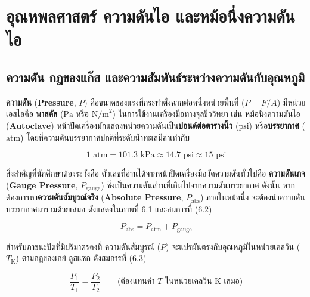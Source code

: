\clearpage

\chapter{อุณหพลศาสตร์ ความดันไอ และหม้อนึ่งความดันไอ}

\section{ความดัน กฎของแก๊ส และความสัมพันธ์ระหว่างความดันกับอุณหภูมิ}


\textbf{ความดัน} (\textbf{Pressure}, $P$) คือขนาดของแรงที่กระทำตั้งฉากต่อหนึ่งหน่วยพื้นที่ ($P = F/A$) มีหน่วยเอสไอคือ \textbf{พาสคัล} ($\text{Pa}$ หรือ $\text{N/m}^2$) ในการใช้งานเครื่องมือทางจุลชีววิทยา เช่น หม้อนึ่งความดันไอ (\textbf{Autoclave}) หน้าปัดเครื่องมักแสดงหน่วยความดันเป็น\textbf{ปอนด์ต่อตารางนิ้ว} ($\text{psi}$) หรือ\textbf{บรรยากาศ} ($\text{atm}$) โดยที่ความดันบรรยากาศปกติที่ระดับน้ำทะเลมีค่าเท่ากับ

\begin{equation}
    1\text{ atm} = 101.3\text{ kPa} \approx 14.7\text{ psi} \approx 15\text{ psi}
\end{equation}

สิ่งสำคัญที่นักศึกษาต้องระวังคือ ตัวเลขที่อ่านได้จากหน้าปัดเครื่องมือวัดความดันทั่วไปคือ \textbf{ความดันเกจ} (\textbf{Gauge Pressure}, $P_{\text{gauge}}$) ซึ่งเป็นความดันส่วนที่เกินไปจากความดันบรรยากาศ ดังนั้น หากต้องการหา\textbf{ความดันสัมบูรณ์จริง} (\textbf{Absolute Pressure}, $P_{\text{abs}}$) ภายในหม้อนึ่ง จะต้องนำความดันบรรยากาศมารวมด้วยเสมอ ดังแสดงใน\mbox{ภาพที่} 6.1 และสมการที่ (6.2)

\begin{equation}
    P_{\text{abs}} = P_{\text{atm}} + P_{\text{gauge}}
\end{equation}

สำหรับภาชนะปิดที่มีปริมาตรคงที่ ความดันสัมบูรณ์ ($P$) จะแปรผันตรงกับอุณหภูมิในหน่วยเคลวิน ($T_{\text{K}}$) ตามกฎของเกย์-ลูสแซก ดังสมการที่ (6.3)

\begin{equation}
    \frac{P_1}{T_1} = \frac{P_2}{T_2} \qquad \text{(ต้องแทนค่า } T \text{ ในหน่วยเคลวิน } \text{K เสมอ)}
\end{equation}

